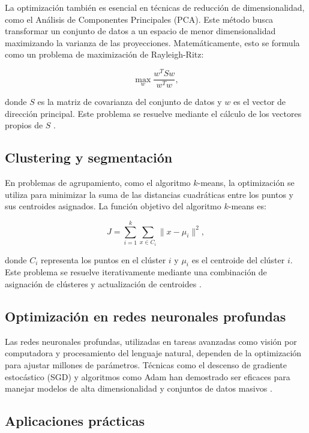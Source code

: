 La optimización también es esencial en técnicas de reducción de dimensionalidad, como el Análisis de Componentes Principales (PCA). Este método busca transformar un conjunto de datos a un espacio de menor dimensionalidad maximizando la varianza de las proyecciones. Matemáticamente, esto se formula como un problema de maximización de Rayleigh-Ritz:

\begin{equation}
	\max_{w} \frac{w^T S w}{w^T w},
\end{equation}

donde \(S\) es la matriz de covarianza del conjunto de datos y \(w\) es el vector de dirección principal. Este problema se resuelve mediante el cálculo de los vectores propios de \(S\) \cite{jolliffe2002principal}.

\subsection{Clustering y segmentación}

En problemas de agrupamiento, como el algoritmo \(k\)-means, la optimización se utiliza para minimizar la suma de las distancias cuadráticas entre los puntos y sus centroides asignados. La función objetivo del algoritmo \(k\)-means es:

\begin{equation}
	J = \sum_{i=1}^k \sum_{x \in C_i} \| x - \mu_i \|^2,
\end{equation}

donde \(C_i\) representa los puntos en el clúster \(i\) y \(\mu_i\) es el centroide del clúster \(i\). Este problema se resuelve iterativamente mediante una combinación de asignación de clústeres y actualización de centroides \cite{bishop2006pattern}.

\subsection{Optimización en redes neuronales profundas}

Las redes neuronales profundas, utilizadas en tareas avanzadas como visión por computadora y procesamiento del lenguaje natural, dependen de la optimización para ajustar millones de parámetros. Técnicas como el descenso de gradiente estocástico (SGD) y algoritmos como Adam han demostrado ser eficaces para manejar modelos de alta dimensionalidad y conjuntos de datos masivos \cite{goodfellow2016deep}.

\subsection{Aplicaciones prácticas}

